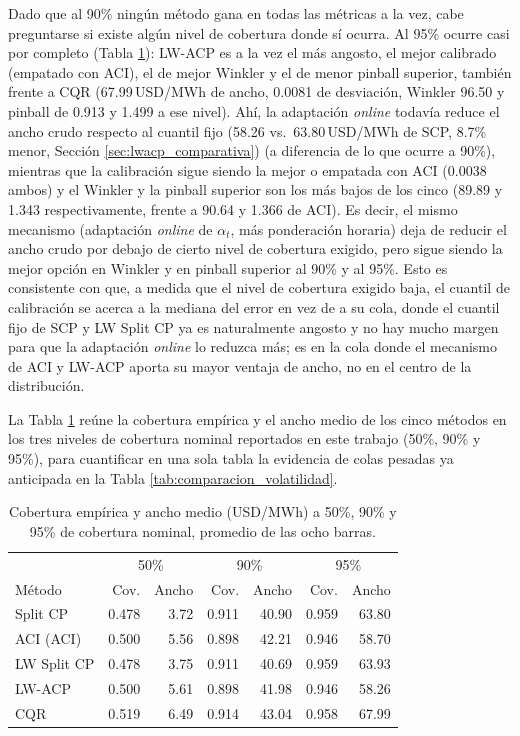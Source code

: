 Dado que al 90\% ningún método gana en todas las métricas a la vez, cabe preguntarse si existe algún nivel de cobertura donde sí ocurra. Al 95\% ocurre casi por completo (Tabla \ref{tab:cp_niveles_full}): LW-ACP es a la vez el más angosto, el mejor calibrado (empatado con ACI), el de mejor Winkler y el de menor pinball superior, también frente a CQR (67.99\,USD/MWh de ancho, 0.0081 de desviación, Winkler 96.50 y pinball de 0.913 y 1.499 a ese nivel). Ahí, la adaptación \textit{online} todavía reduce el ancho crudo respecto al cuantil fijo (58.26 vs.\ 63.80\,USD/MWh de SCP, 8.7\% menor, Sección \ref{sec:lwacp_comparativa}) (a diferencia de lo que ocurre a 90\%), mientras que la calibración sigue siendo la mejor o empatada con ACI (0.0038 ambos) y el Winkler y la pinball superior son los más bajos de los cinco (89.89 y 1.343 respectivamente, frente a 90.64 y 1.366 de ACI). Es decir, el mismo mecanismo (adaptación \textit{online} de $\alpha_t$, más ponderación horaria) deja de reducir el ancho crudo por debajo de cierto nivel de cobertura exigido, pero sigue siendo la mejor opción en Winkler y en pinball superior al 90\% y al 95\%. Esto es consistente con que, a medida que el nivel de cobertura exigido baja, el cuantil de calibración se acerca a la mediana del error en vez de a su cola, donde el cuantil fijo de SCP y LW Split CP ya es naturalmente angosto y no hay mucho margen para que la adaptación \textit{online} lo reduzca más; es en la cola donde el mecanismo de ACI y LW-ACP aporta su mayor ventaja de ancho, no en el centro de la distribución.

La Tabla \ref{tab:cp_niveles_full} reúne la cobertura empírica y el ancho medio de los cinco métodos en los tres niveles de cobertura nominal reportados en este trabajo (50\%, 90\% y 95\%), para cuantificar en una sola tabla la evidencia de colas pesadas ya anticipada en la Tabla \ref{tab:comparacion_volatilidad}.

\begin{table}[htbp]
    \centering
    \begin{tabular}{lrrrrrr}
        \toprule
        & \multicolumn{2}{c}{50\%} & \multicolumn{2}{c}{90\%} & \multicolumn{2}{c}{95\%} \\
        Método & Cov. & Ancho & Cov. & Ancho & Cov. & Ancho \\
        \midrule
        Split CP    & 0.478 & 3.72 & 0.911 & 40.90 & 0.959 & 63.80 \\
        ACI (ACI)   & 0.500 & 5.56 & 0.898 & 42.21 & 0.946 & 58.70 \\
        LW Split CP & 0.478 & 3.75 & 0.911 & 40.69 & 0.959 & 63.93 \\
        LW-ACP      & 0.500 & 5.61 & 0.898 & 41.98 & 0.946 & 58.26 \\
        CQR         & 0.519 & 6.49 & 0.914 & 43.04 & 0.958 & 67.99 \\
        \bottomrule
    \end{tabular}
    \vspace{0.2cm}
    \caption{Cobertura empírica y ancho medio (USD/MWh) a 50\%, 90\% y 95\% de cobertura nominal, promedio de las ocho barras.}
    \label{tab:cp_niveles_full}
\end{table}

